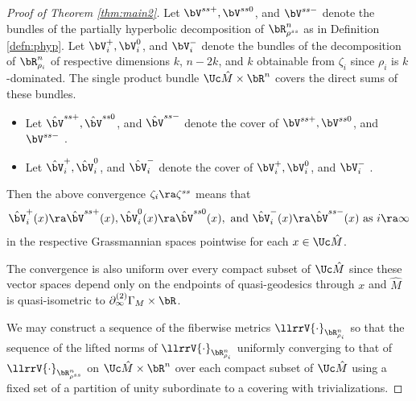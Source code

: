 \begin{proof}[Proof of Theorem  \ref{thm:main2}]
Let $\bV^{ss+}, \bV^{ss0}$, and $\bV^{ss-}$ denote the bundles of the partially hyperbolic decomposition of $\bR^n_{\rho^{ss}}$ 
as in Definition \ref{defn:phyp}. 
Let $\bV^{+}_i, \bV^{0}_i$, and $\bV^{-}_i$ denote the bundles of the decomposition of $\bR^n_{\rho_i}$ 
of respective dimensions $k$, $n-2k$, and $k$ obtainable from $\zeta_i$
since $\rho_i$ is $k$-dominated.  
The  single product bundle $\Uc \hat M \times \bR^n$ covers the direct sums of these bundles.
\begin{itemize} 
\item Let $\hat \bV^{ss+}, \hat \bV^{ss0}$, and $\hat \bV^{ss-}$ denote the cover of 
$\bV^{ss+}, \bV^{ss0}$, and $\bV^{ss-}$ . 
\item Let $\hat \bV^{+}_i, \hat \bV^{0}_i$, and $\hat \bV^{-}_i$ denote the cover of 
$\bV^{+}_i, \bV^{0}_i$, and $\bV^{-}_i$ .  
\end{itemize} 
Then the above convergence $\zeta_i \ra \zeta^{ss}$ means that 
\begin{equation} \label{eqn:convB}
\hat \bV^{+}_i(x) \ra \hat \bV^{ss+}(x), \hat \bV^{0}_i(x) \ra \hat \bV^{ss0}(x), 
\text{ and } \hat \bV^{-}_i(x) \ra \hat \bV^{ss-}(x) \text{ as } i \ra \infty
\end{equation}
in the respective Grassmannian spaces pointwise for each $x \in \Uc \hat{M}$. 
 
The convergence is also uniform over every compact subset of $\Uc\hat{M}$
since these vector spaces depend only on the endpoints of quasi-geodesics through $x$
and $\hat M$ is quasi-isometric to $\partial^{(2)}_\infty \Gamma_M \times \bR$. 

We may construct a sequence of the fiberwise metrics $\llrrV{\cdot}_{\bR^n_{\rho_i}}$  so that 
the sequence of the lifted norms of $\llrrV{\cdot}_{\bR^n_{\rho_i}}$  
uniformly converging to that of  $\llrrV{\cdot}_{\bR^n_{\rho^{ss}}}$ on $\Uc \hat M \times \bR^n$
over each compact subset of $\Uc \hat M$ 
using a fixed set of a partition of unity subordinate to a covering with trivializations.  


\end{proof}
